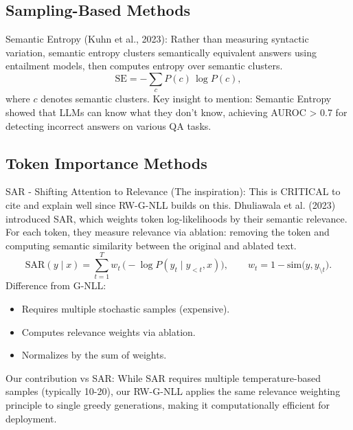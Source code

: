 \documentclass[a4paper,oneside,10pt,ngerman,english]{scrbook}
\begin{document}
\subsection{Sampling-Based Methods}
Semantic Entropy (Kuhn et al., 2023):
Rather than measuring syntactic variation, semantic entropy clusters semantically equivalent answers using entailment models, then computes entropy over semantic clusters.
\begin{equation}
\mathrm{SE} = -\sum_{c} P(c)\,\log P(c),
\end{equation}
where $c$ denotes semantic clusters.
Key insight to mention:
Semantic Entropy showed that LLMs can know what they don't know, achieving AUROC > 0.7 for detecting incorrect answers on various QA tasks.
\subsection{Token Importance Methods}
SAR - Shifting Attention to Relevance (The inspiration):
This is CRITICAL to cite and explain well since RW-G-NLL builds on this.
Dhuliawala et al. (2023) introduced SAR, which weights token log-likelihoods by their semantic relevance. For each token, they measure relevance via ablation: removing the token and computing semantic similarity between the original and ablated text.
\begin{equation}
\mathrm{SAR}(y\mid x) = \sum_{t=1}^{T} w_t\,\bigl(-\log P(y_t\mid y_{<t}, x)\bigr),
\qquad w_t = 1 - \mathrm{sim}\bigl(y, y_{\setminus t}\bigr).
\end{equation}
Difference from G-NLL:
\begin{itemize}
\item Requires multiple stochastic samples (expensive).
\item Computes relevance weights via ablation.
\item Normalizes by the sum of weights.
\end{itemize}
Our contribution vs SAR:
While SAR requires multiple temperature-based samples (typically 10-20), our RW-G-NLL applies the same relevance weighting principle to single greedy generations, making it computationally efficient for deployment.
\end{document}
